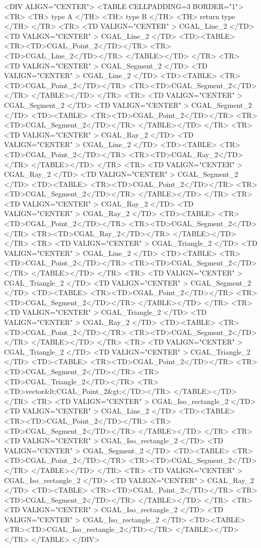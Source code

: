 \begin{ccHtmlOnly}
<DIV ALIGN="CENTER">
<TABLE CELLPADDING=3 BORDER="1">
<TR> <TH> type A </TH>
 <TH> type B </TH>
 <TH> return type </TH>
</TR>
<TR>
    <TD VALIGN="CENTER" > CGAL_Line_2 </TD>
    <TD VALIGN="CENTER" > CGAL_Line_2 </TD>
    <TD><TABLE>
	<TR><TD>CGAL_Point_2</TD></TR>
	<TR><TD>CGAL_Line_2</TD></TR>
        </TABLE></TD>
</TR>
<TR>
    <TD VALIGN="CENTER" > CGAL_Segment_2 </TD>
    <TD VALIGN="CENTER" > CGAL_Line_2 </TD>
    <TD><TABLE>
	<TR><TD>CGAL_Point_2</TD></TR>
	<TR><TD>CGAL_Segment_2</TD></TR>
      </TABLE></TD>
</TR>
<TR>
    <TD VALIGN="CENTER" > CGAL_Segment_2 </TD>
    <TD VALIGN="CENTER" > CGAL_Segment_2 </TD>
    <TD><TABLE>
	<TR><TD>CGAL_Point_2</TD></TR>
	<TR><TD>CGAL_Segment_2</TD></TR>
      </TABLE></TD>
</TR>
<TR>
    <TD VALIGN="CENTER" > CGAL_Ray_2 </TD>
    <TD VALIGN="CENTER" > CGAL_Line_2 </TD>
    <TD><TABLE>
	<TR><TD>CGAL_Point_2</TD></TR>
	<TR><TD>CGAL_Ray_2</TD></TR>
      </TABLE></TD>
</TR>
<TR>
    <TD VALIGN="CENTER" > CGAL_Ray_2 </TD>
    <TD VALIGN="CENTER" > CGAL_Segment_2 </TD>
    <TD><TABLE>
	<TR><TD>CGAL_Point_2</TD></TR>
	<TR><TD>CGAL_Segment_2</TD></TR>
      </TABLE></TD>
</TR>
<TR>
    <TD VALIGN="CENTER" > CGAL_Ray_2 </TD>
    <TD VALIGN="CENTER" > CGAL_Ray_2 </TD>
    <TD><TABLE>
	<TR><TD>CGAL_Point_2</TD></TR>
	<TR><TD>CGAL_Segment_2</TD></TR>
	<TR><TD>CGAL_Ray_2</TD></TR>
      </TABLE></TD>
</TR>
<TR>
    <TD VALIGN="CENTER" > CGAL_Triangle_2 </TD>
    <TD VALIGN="CENTER" > CGAL_Line_2 </TD>
    <TD><TABLE>
	<TR><TD>CGAL_Point_2</TD></TR>
	<TR><TD>CGAL_Segment_2</TD></TR>
      </TABLE></TD>
</TR>
<TR>
    <TD VALIGN="CENTER" > CGAL_Triangle_2 </TD>
    <TD VALIGN="CENTER" > CGAL_Segment_2 </TD>
    <TD><TABLE>
	<TR><TD>CGAL_Point_2</TD></TR>
	<TR><TD>CGAL_Segment_2</TD></TR>
      </TABLE></TD>
</TR>
<TR>
    <TD VALIGN="CENTER" > CGAL_Triangle_2 </TD>
    <TD VALIGN="CENTER" > CGAL_Ray_2 </TD>
    <TD><TABLE>
	<TR><TD>CGAL_Point_2</TD></TR>
	<TR><TD>CGAL_Segment_2</TD></TR>
      </TABLE></TD>
</TR>
<TR>
    <TD VALIGN="CENTER" > CGAL_Triangle_2 </TD>
    <TD VALIGN="CENTER" > CGAL_Triangle_2 </TD>
    <TD><TABLE>
	<TR><TD>CGAL_Point_2</TD></TR>
	<TR><TD>CGAL_Segment_2</TD></TR>
	<TR><TD>CGAL_Triangle_2</TD></TR>
	<TR><TD>vector&lt;CGAL_Point_2&gt;</TD></TR>
      </TABLE></TD>
</TR>
<TR>
    <TD VALIGN="CENTER" > CGAL_Iso_rectangle_2 </TD>
    <TD VALIGN="CENTER" > CGAL_Line_2 </TD>
    <TD><TABLE>
	<TR><TD>CGAL_Point_2</TD></TR>
	<TR><TD>CGAL_Segment_2</TD></TR>
      </TABLE></TD>
</TR>
<TR>
    <TD VALIGN="CENTER" > CGAL_Iso_rectangle_2 </TD>
    <TD VALIGN="CENTER" > CGAL_Segment_2 </TD>
    <TD><TABLE>
	<TR><TD>CGAL_Point_2</TD></TR>
	<TR><TD>CGAL_Segment_2</TD></TR>
      </TABLE></TD>
</TR>
<TR>
    <TD VALIGN="CENTER" > CGAL_Iso_rectangle_2 </TD>
    <TD VALIGN="CENTER" > CGAL_Ray_2 </TD>
    <TD><TABLE>
	<TR><TD>CGAL_Point_2</TD></TR>
	<TR><TD>CGAL_Segment_2</TD></TR>
      </TABLE></TD>
</TR>
<TR>
    <TD VALIGN="CENTER" > CGAL_Iso_rectangle_2 </TD>
    <TD VALIGN="CENTER" > CGAL_Iso_rectangle_2 </TD>
    <TD><TABLE>
	<TR><TD>CGAL_Iso_rectangle_2</TD></TR>
      </TABLE></TD>
</TR>
</TABLE>
</DIV>
\end{ccHtmlOnly}



